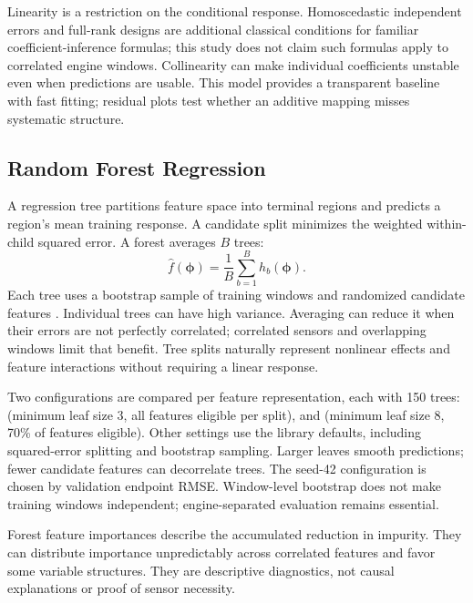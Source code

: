 \documentclass[11pt]{article}
\begin{document}
Linearity is a restriction on the conditional response. Homoscedastic independent errors and full-rank designs are additional classical conditions for familiar coefficient-inference formulas; this study does not claim such formulas apply to correlated engine windows. Collinearity can make individual coefficients unstable even when predictions are usable. This model provides a transparent baseline with fast fitting; residual plots test whether an additive mapping misses systematic structure.
\subsection{Random Forest Regression}
A regression tree partitions feature space into terminal regions and predicts a region's mean training response. A candidate split minimizes the weighted within-child squared error. A forest averages $B$ trees:
\begin{equation}
 \hat f(\boldsymbol\phi)=\frac{1}{B}\sum_{b=1}^{B}h_b(\boldsymbol\phi).
\end{equation}
Each tree uses a bootstrap sample of training windows and randomized candidate features \cite{breiman,sklearnrf}. Individual trees can have high variance. Averaging can reduce it when their errors are not perfectly correlated; correlated sensors and overlapping windows limit that benefit. Tree splits naturally represent nonlinear effects and feature interactions without requiring a linear response.

Two configurations are compared per feature representation, each with 150 trees: (minimum leaf size 3, all features eligible per split), and (minimum leaf size 8, 70\% of features eligible). Other settings use the library defaults, including squared-error splitting and bootstrap sampling. Larger leaves smooth predictions; fewer candidate features can decorrelate trees. The seed-42 configuration is chosen by validation endpoint RMSE. Window-level bootstrap does not make training windows independent; engine-separated evaluation remains essential.

Forest feature importances describe the accumulated reduction in impurity. They can distribute importance unpredictably across correlated features and favor some variable structures. They are descriptive diagnostics, not causal explanations or proof of sensor necessity.
\end{document}
